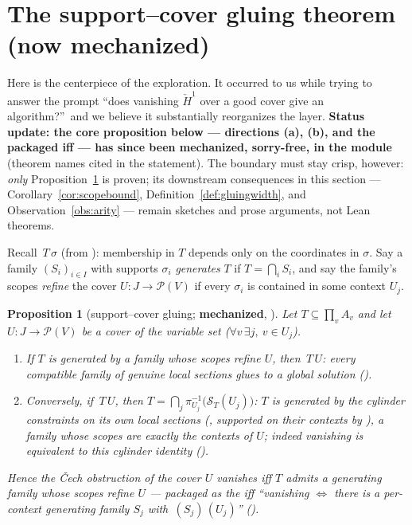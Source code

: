 \documentclass[11pt]{article}
\newtheorem{proposition}{Proposition}
\newcommand{\Sec}{\mathcal S}
\newcommand{\Hech}{\check H}
\begin{document}
\section{The support--cover gluing theorem (now mechanized)}
\label{sec:supportcover}

Here is the centerpiece of the exploration.  It occurred to us while
trying to answer the prompt ``does vanishing $\Hech^1$ over a good
cover give an algorithm?''\ and we believe it substantially
reorganizes the layer.  \textbf{Status update: the core proposition
below --- directions (a), (b), and the packaged iff --- has since
been mechanized, sorry-free, in the module }
(theorem names cited in the statement).  The boundary must stay
crisp, however: \emph{only} Proposition~\ref{prop:supportcover} is
proven; its downstream consequences in this section ---
Corollary~\ref{cor:scopebound}, Definition~\ref{def:gluingwidth}, and
Observation~\ref{obs:arity} --- remain sketches and prose arguments,
not Lean theorems.

Recall $\,T\,\sigma$ (from ):
membership in $T$ depends only on the coordinates in $\sigma$.  Say a
family $(S_i)_{i \in I}$ with supports $\sigma_i$ \emph{generates} $T$
if $T = \bigcap_i S_i$, and say the family's scopes \emph{refine} the
cover $U : J \to \mathcal P(V)$ if every $\sigma_i$ is contained in
some context $U_j$.

\begin{proposition}[support--cover gluing; \textbf{mechanized},
]
\label{prop:supportcover}
Let $T \subseteq \prod_v A_v$ and let $U : J \to \mathcal P(V)$ be a
cover of the variable set ($\forall v\, \exists j,\ v \in U_j$).
\begin{enumerate}
\item[(a)] If $T$ is generated by a family whose scopes refine $U$,
  then $\,T\,U$: every compatible family of
  genuine local sections glues to a global solution
  ().
\item[(b)] Conversely, if $\,T\,U$, then $T =
  \bigcap_{j} \pi_{U_j}^{-1}\!\bigl(\Sec_T(U_j)\bigr)$: $T$ is
  generated by the cylinder constraints on its own local sections
  (, supported on their contexts by
  ), a family whose scopes are
  exactly the contexts of $U$; indeed vanishing is \emph{equivalent}
  to this cylinder identity
  ().
\end{enumerate}
Hence the \v{C}ech obstruction of the cover $U$ vanishes \emph{iff}
$T$ admits a generating family whose scopes refine $U$ --- packaged
as the iff ``vanishing $\iff$ there is a per-context generating
family $S_j$ with $\,(S_j)\,(U_j)$''
().
\end{proposition}
\end{document}
